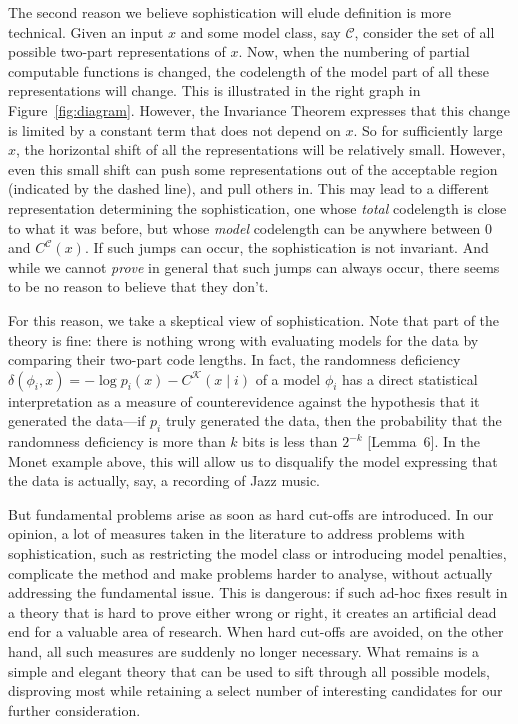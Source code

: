 \documentclass{style/llncs}
\newcommand{\C}{\mathscr C}
\newcommand{\K}{\mathscr K}
\begin{document}
The second reason we believe sophistication will elude definition is more technical. Given an input $x$ and some model class, say $\C$, consider the set of all possible two-part representations of $x$. Now, when the numbering of partial computable functions is changed, the codelength of the model part of all these representations will change. This is illustrated in the right graph in Figure~\ref{fig:diagram}. However, the Invariance Theorem expresses that this change is limited by a constant term that does not depend on $x$. So for sufficiently large $x$, the horizontal shift of all the representations will be relatively small. However, even this small shift can push some representations out of the acceptable region (indicated by the dashed line), and pull others in. This may lead to a different representation determining the sophistication, one whose \emph{total} codelength is close to what it was before, but whose \emph{model} codelength can be anywhere between $0$ and $C^\C(x)$. If such jumps can occur, the sophistication is not invariant. And while we cannot \emph{prove} in general that such jumps can always occur, there seems to be no reason to believe that they don't.

For this reason, we take a skeptical view of sophistication. Note that part of the theory is fine: there is nothing wrong with evaluating models for the data by comparing their two-part code lengths. In fact, the randomness deficiency $\delta(\phi_i,x)=-\log p_i(x)-C^\K(x\mid i)$ of a model $\phi_i$ has a direct statistical interpretation as a measure of counterevidence against the hypothesis that it generated the data---if $p_i$ truly generated the data, then the probability that the randomness deficiency is more than $k$ bits is less than $2^{-k}$ \cite{bloem2014safe}[Lemma~6]. In the Monet example above, this will allow us to disqualify the model expressing that the data is actually, say, a recording of Jazz music.

But fundamental problems arise as soon as hard cut-offs are introduced. In our opinion, a lot of measures taken in the literature to address problems with sophistication, such as restricting the model class or introducing model penalties, complicate the method and make problems harder to analyse, without actually addressing the fundamental issue. This is dangerous: if such ad-hoc fixes result in a theory that is hard to prove either wrong or right, it creates an artificial dead end for a valuable area of research. When hard cut-offs are avoided, on the other hand, all such measures are suddenly no longer necessary. What remains is a simple and elegant theory that can be used to sift through all possible models, disproving most while retaining a select number of interesting candidates for our further consideration.
\end{document}
